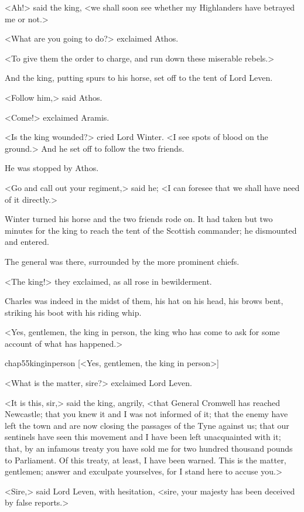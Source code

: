 <Ah!> said the king, <we shall soon see whether my Highlanders have betrayed me or not.>

<What are you going to do?> exclaimed Athos.

<To give them the order to charge, and run down these miserable rebels.>

And the king, putting spurs to his horse, set off to the tent of Lord Leven.

<Follow him,> said Athos.

<Come!> exclaimed Aramis.

<Is the king wounded?> cried Lord Winter. <I see spots of blood on the ground.> And he set off to follow the two friends.

He was stopped by Athos.

<Go and call out your regiment,> said he; <I can foresee that we shall have need of it directly.>

Winter turned his horse and the two friends rode on. It had taken but two minutes for the king to reach the tent of the Scottish commander; he dismounted and entered.

The general was there, surrounded by the more prominent chiefs.

<The king!> they exclaimed, as all rose in bewilderment.

Charles was indeed in the midst of them, his hat on his head, his brows bent, striking his boot with his riding whip.

<Yes, gentlemen, the king in person, the king who has come to ask for some account of what has happened.>

\begin{bwbigpic}
	[\basicscale] 
	{chap55kinginperson}
	[<Yes, gentlemen, the king in person>]
\end{bwbigpic}

<What is the matter, sire?> exclaimed Lord Leven.

<It is this, sir,> said the king, angrily, <that General Cromwell has reached Newcastle; that you knew it and I was not informed of it; that the enemy have left the town and are now closing the passages of the Tyne against us; that our sentinels have seen this movement and I have been left unacquainted with it; that, by an infamous treaty you have sold me for two hundred thousand pounds to Parliament. Of this treaty, at least, I have been warned. This is the matter, gentlemen; answer and exculpate yourselves, for I stand here to accuse you.>

<Sire,> said Lord Leven, with hesitation, <sire, your majesty has been deceived by false reports.>

